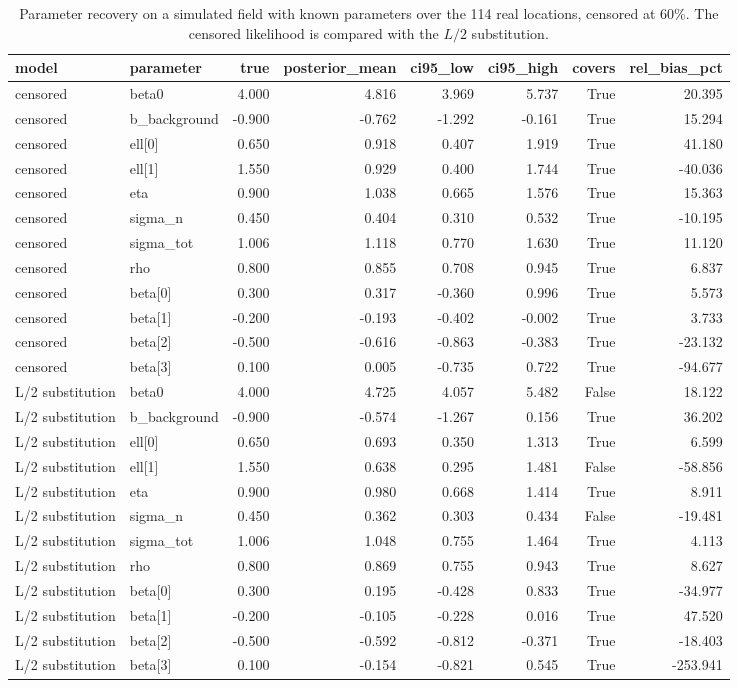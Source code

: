 \begin{table}[htbp]
\centering
\caption{Parameter recovery on a simulated field with known parameters over the 114 real locations, censored at 60\%. The censored likelihood is compared with the $L/2$ substitution.}
\label{tab:recovery}
\footnotesize
\begin{tabular}{llrrrrrr}
\toprule
model & parameter & true & posterior\_mean & ci95\_low & ci95\_high & covers & rel\_bias\_pct \\
\midrule
censored & beta0 & 4.000 & 4.816 & 3.969 & 5.737 & True & 20.395 \\
censored & b\_background & -0.900 & -0.762 & -1.292 & -0.161 & True & 15.294 \\
censored & ell[0] & 0.650 & 0.918 & 0.407 & 1.919 & True & 41.180 \\
censored & ell[1] & 1.550 & 0.929 & 0.400 & 1.744 & True & -40.036 \\
censored & eta & 0.900 & 1.038 & 0.665 & 1.576 & True & 15.363 \\
censored & sigma\_n & 0.450 & 0.404 & 0.310 & 0.532 & True & -10.195 \\
censored & sigma\_tot & 1.006 & 1.118 & 0.770 & 1.630 & True & 11.120 \\
censored & rho & 0.800 & 0.855 & 0.708 & 0.945 & True & 6.837 \\
censored & beta[0] & 0.300 & 0.317 & -0.360 & 0.996 & True & 5.573 \\
censored & beta[1] & -0.200 & -0.193 & -0.402 & -0.002 & True & 3.733 \\
censored & beta[2] & -0.500 & -0.616 & -0.863 & -0.383 & True & -23.132 \\
censored & beta[3] & 0.100 & 0.005 & -0.735 & 0.722 & True & -94.677 \\
L/2 substitution & beta0 & 4.000 & 4.725 & 4.057 & 5.482 & False & 18.122 \\
L/2 substitution & b\_background & -0.900 & -0.574 & -1.267 & 0.156 & True & 36.202 \\
L/2 substitution & ell[0] & 0.650 & 0.693 & 0.350 & 1.313 & True & 6.599 \\
L/2 substitution & ell[1] & 1.550 & 0.638 & 0.295 & 1.481 & False & -58.856 \\
L/2 substitution & eta & 0.900 & 0.980 & 0.668 & 1.414 & True & 8.911 \\
L/2 substitution & sigma\_n & 0.450 & 0.362 & 0.303 & 0.434 & False & -19.481 \\
L/2 substitution & sigma\_tot & 1.006 & 1.048 & 0.755 & 1.464 & True & 4.113 \\
L/2 substitution & rho & 0.800 & 0.869 & 0.755 & 0.943 & True & 8.627 \\
L/2 substitution & beta[0] & 0.300 & 0.195 & -0.428 & 0.833 & True & -34.977 \\
L/2 substitution & beta[1] & -0.200 & -0.105 & -0.228 & 0.016 & True & 47.520 \\
L/2 substitution & beta[2] & -0.500 & -0.592 & -0.812 & -0.371 & True & -18.403 \\
L/2 substitution & beta[3] & 0.100 & -0.154 & -0.821 & 0.545 & True & -253.941 \\
\bottomrule
\end{tabular}
\end{table}
